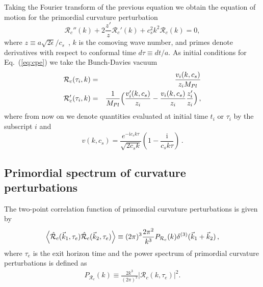\documentclass[aps,prl,amsmath,nofootinbib,twocolumn]{revtex4}
\newcommand{\3}{\partial}
\newcommand{\4}{\frac}
\newcommand{\5}{\delta}
\renewcommand\({\left(}
\renewcommand\){\right)}
\renewcommand\[{\left[}
\renewcommand\]{\right]}
\newcommand{\bea}{\begin{eqnarray}}
\newcommand{\eea}{\end{eqnarray}}
\newcommand{\eqn}[1]{(\ref{#1})}
\begin{document}
Taking the Fourier transform of the previous equation we obtain the equation of motion for the primordial curvature perturbation 
\begin{equation}\label{eq:cpe}
  \mathcal{R}_{c}''(k) + 2 \frac{z'}{z} \mathcal{R}_{c}'(k) + c^2_s k^2 \mathcal{R}_{c}(k) = 0,
\end{equation}
where $z\equiv a\sqrt{2 \epsilon}/c_s$~\cite{Langlois:2010xc}, $k$ is the comoving wave number, and primes denote derivatives with respect to conformal time $d\tau \equiv dt/a$. 
As initial conditions for Eq.~\eqn{eq:cpe} we take the Bunch-Davies vacuum \cite{Bunch:1978yq, Noumi:2014zqa, Langlois:2010xc} 
\bea 
\label{eq:ic1}
\mathcal{R}_c(\tau_i,k) &=& \frac{v_i(k, c_s)}{z_i  M_{Pl}} \\ 
\label{eq:ic2}
\mathcal{R}'_c(\tau_i,k) &=& \frac{1}{ M_{Pl}} \Bigl( \frac{v'_i(k, c_s)}{z_i}-\frac{v_i(k, c_s)}{z_i} \frac{z'_i}{z_i} \Bigr)\, ,
\eea
where from now on we denote quantities evaluated at initial time $t_i$ or $\tau_i$ by the subscript $i$ and
\begin{equation}
  v(k,c_s)=\frac{e^{-\mathrm{i} c_s k  \tau}}{\sqrt{2c_s k }}\left(1-\frac{\mathrm{i}}{c_s k \tau}\right)\,.
\end{equation}


\subsection{Primordial spectrum of curvature perturbations}\label{pscp}
The two-point correlation function of primordial curvature perturbations is given 
by~\cite{Ade:2015lrj,Planck:2013jfk}
\begin{equation}
 \Braket{ \hat{\mathcal{R}}_c(\vec{k}_1, \tau_e) \hat{\mathcal{R}}_c(\vec{k}_2, \tau_e) } \equiv (2\pi)^3 
\frac{2\pi^2}{k^3} P_{\mathcal{R}_c}(k) \delta^{(3)}(\vec{k}_1+\vec{k}_2) \, ,
\end{equation}
where $\tau_e$ is the exit horizon time and the power spectrum of primordial curvature perturbations is defined as 
\bea
P_{\mathcal{R}_{c}}(k) \equiv \frac{2k^3}{(2\pi)^2}|\mathcal{R}_{c}(k, \tau_e)|^2.
\eea
\end{document}
